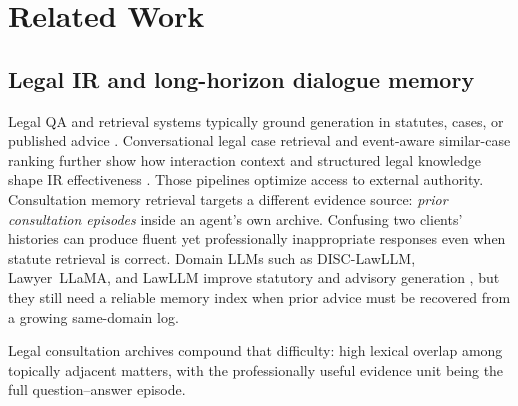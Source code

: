 \documentclass[preprint,12pt,authoryear]{elsarticle}
\begin{document}
\section{Related Work}\label{sec:related}

\subsection{Legal IR and long-horizon dialogue memory}
Legal QA and retrieval systems typically ground generation in statutes, cases, or published advice \cite{louis2024lleqa, askari2024legalqa, martinezgil2023survey, ashley2017artificial}.
Conversational legal case retrieval and event-aware similar-case ranking further show how interaction context and structured legal knowledge shape IR effectiveness \cite{liu2022query, zhang2024event}.
Those pipelines optimize access to external authority.
Consultation memory retrieval targets a different evidence source: \emph{prior consultation episodes} inside an agent's own archive.
Confusing two clients' histories can produce fluent yet professionally inappropriate responses even when statute retrieval is correct.
Domain LLMs such as DISC-LawLLM, Lawyer~LLaMA, and LawLLM improve statutory and advisory generation \cite{yue2023disclawllm, huang2023lawyer, yue2024lawllm}, but they still need a reliable memory index when prior advice must be recovered from a growing same-domain log.

Legal consultation archives compound that difficulty: high lexical overlap among topically adjacent matters, with the professionally useful evidence unit being the full question--answer episode.
\end{document}

